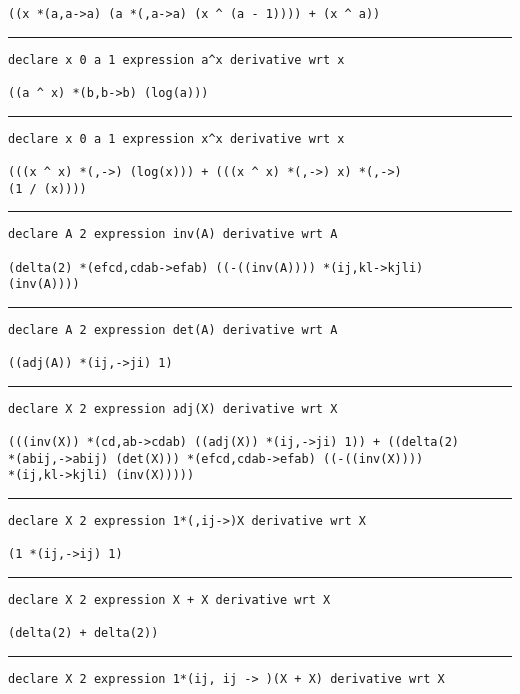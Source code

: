 \documentclass[12pt, a4paper]{report} %
\begin{document}
\begin{multicols}{2}
\begin{verbatim}
((x *(a,a->a) (a *(,a->a) (x ^ (a - 1)))) + (x ^ a))
\end{verbatim}
\vspace{-20pt} \rule[-10pt]{\columnwidth}{0.1pt} 
\begin{verbatim}
declare x 0 a 1 expression a^x derivative wrt x

((a ^ x) *(b,b->b) (log(a)))
\end{verbatim}
\vspace{-20pt} \rule[-10pt]{\columnwidth}{0.1pt} 
\begin{verbatim}
declare x 0 a 1 expression x^x derivative wrt x

(((x ^ x) *(,->) (log(x))) + (((x ^ x) *(,->) x) *(,->) 
(1 / (x))))
\end{verbatim}
\vspace{-20pt} \rule[-10pt]{\columnwidth}{0.1pt} 
\begin{verbatim}
declare A 2 expression inv(A) derivative wrt A

(delta(2) *(efcd,cdab->efab) ((-((inv(A)))) *(ij,kl->kjli) 
(inv(A))))
\end{verbatim}
\vspace{-20pt} \rule[-10pt]{\columnwidth}{0.1pt} 
\begin{verbatim}
declare A 2 expression det(A) derivative wrt A

((adj(A)) *(ij,->ji) 1)
\end{verbatim}
\vspace{-20pt} \rule[-10pt]{\columnwidth}{0.1pt} 
\begin{verbatim}
declare X 2 expression adj(X) derivative wrt X

(((inv(X)) *(cd,ab->cdab) ((adj(X)) *(ij,->ji) 1)) + ((delta(2) 
*(abij,->abij) (det(X))) *(efcd,cdab->efab) ((-((inv(X)))) 
*(ij,kl->kjli) (inv(X)))))
\end{verbatim}
\vspace{-20pt} \rule[-10pt]{\columnwidth}{0.1pt} 
\begin{verbatim}
declare X 2 expression 1*(,ij->)X derivative wrt X

(1 *(ij,->ij) 1)
\end{verbatim}
\vspace{-20pt} \rule[-10pt]{\columnwidth}{0.1pt} 
\begin{verbatim}
declare X 2 expression X + X derivative wrt X

(delta(2) + delta(2))
\end{verbatim}
\vspace{-20pt} \rule[-10pt]{\columnwidth}{0.1pt} 
\begin{verbatim}
declare X 2 expression 1*(ij, ij -> )(X + X) derivative wrt X


\end{verbatim}
\end{multicols}
\end{document}
